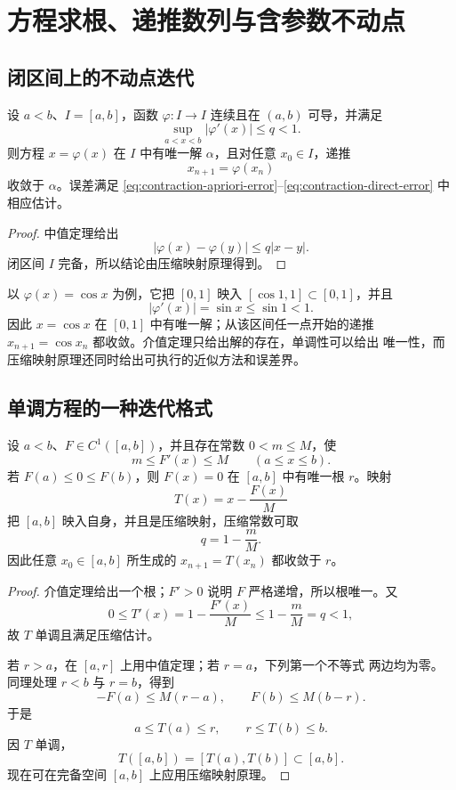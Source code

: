 \section{方程求根、递推数列与含参数不动点}

\subsection{闭区间上的不动点迭代}

\begin{proposition}[一元压缩迭代]
\label{prop:scalar-contraction-iteration}
设 \(a<b\)、\(I=[a,b]\)，函数 \(\varphi:I\to I\) 连续且在
\((a,b)\) 可导，并满足
\[
 \sup_{a<x<b}|\varphi'(x)|\le q<1.
\]
则方程 \(x=\varphi(x)\) 在 \(I\) 中有唯一解 \(\alpha\)，且对任意
\(x_0\in I\)，递推
\[
 x_{n+1}=\varphi(x_n)
\]
收敛于 \(\alpha\)。误差满足
\eqref{eq:contraction-apriori-error}--\eqref{eq:contraction-direct-error}
中相应估计。
\end{proposition}

\begin{proof}
中值定理给出
\[
 |\varphi(x)-\varphi(y)|\le q|x-y|.
\]
闭区间 \(I\) 完备，所以结论由压缩映射原理得到。
\end{proof}

以 \(\varphi(x)=\cos x\) 为例，它把 \([0,1]\) 映入
\([\cos1,1]\subset[0,1]\)，并且
\[
 |\varphi'(x)|=\sin x\le\sin1<1.
\]
因此 \(x=\cos x\) 在 \([0,1]\) 中有唯一解；从该区间任一点开始的递推
\(x_{n+1}=\cos x_n\) 都收敛。介值定理只给出解的存在，单调性可以给出
唯一性，而压缩映射原理还同时给出可执行的近似方法和误差界。

\subsection{单调方程的一种迭代格式}

\begin{theorem}[带导数界的求根迭代]
\label{thm:monotone-root-contraction}
设 \(a<b\)、\(F\in C^1([a,b])\)，并且存在常数 \(0<m\le M\)，使
\[
 m\le F'(x)\le M\qquad(a\le x\le b).
\]
若 \(F(a)\le0\le F(b)\)，则 \(F(x)=0\) 在 \([a,b]\) 中有唯一根
\(r\)。映射
\[
 T(x)=x-\frac{F(x)}{M}
\]
把 \([a,b]\) 映入自身，并且是压缩映射，压缩常数可取
\[
 q=1-\frac{m}{M}.
\]
因此任意 \(x_0\in[a,b]\) 所生成的 \(x_{n+1}=T(x_n)\) 都收敛于
\(r\)。
\end{theorem}

\begin{proof}
介值定理给出一个根；\(F'>0\) 说明 \(F\) 严格递增，所以根唯一。又
\[
 0\le T'(x)=1-\frac{F'(x)}{M}\le1-\frac{m}{M}=q<1,
\]
故 \(T\) 单调且满足压缩估计。

若 \(r>a\)，在 \([a,r]\) 上用中值定理；若 \(r=a\)，下列第一个不等式
两边均为零。同理处理 \(r<b\) 与 \(r=b\)，得到
\[
 -F(a)\le M(r-a),\qquad F(b)\le M(b-r).
\]
于是
\[
 a\le T(a)\le r,\qquad r\le T(b)\le b.
\]
因 \(T\) 单调，
\[
 T([a,b])=[T(a),T(b)]\subset[a,b].
\]
现在可在完备空间 \([a,b]\) 上应用压缩映射原理。
\end{proof}


